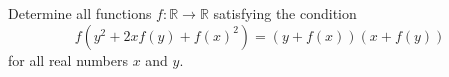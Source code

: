 Determine all functions $f:\mathbb{R}\to\mathbb{R}$ satisfying the condition \[f\left(y^2+2xf\left(y\right)+f\left(x\right)^2\right)=\left(y+f\left(x\right)\right)\left(x+f\left(y\right)\right)\] for all real numbers $x$ and $y$.